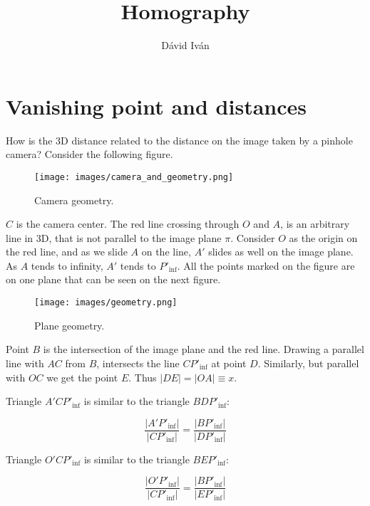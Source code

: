 \documentclass{article}
\title{Homography}
\author{Dávid Iván}
\begin{document}
\maketitle

\tableofcontents

\newpage

\section{Vanishing point and distances}

How is the 3D distance related to the distance on the image taken by a pinhole camera? Consider the following figure.

\begin{figure}[ht]
 \centering
  \texttt{[image: images/camera\_and\_geometry.png]}
 \caption{Camera geometry.}
\end{figure}

$C$ is the camera center. The red line crossing through $O$ and $A$, is an arbitrary line in 3D, that is not parallel to the image plane $\pi$. Consider $O$ as the origin on the red line, and as we slide $A$ on the line, $A'$ slides as well on the image plane. As $A$ tends to infinity, $A'$ tends to $P'_{\text{inf}}$. All the points marked on the figure are on one plane that can be seen on the next figure.

\begin{figure}[ht]
 \centering
  \texttt{[image: images/geometry.png]}
 \caption{Plane geometry.}
\end{figure}

Point $B$ is the intersection of the image plane and the red line. Drawing a parallel line with $AC$ from $B$, intersects the line $CP'_{\text{inf}}$ at point $D$. Similarly, but parallel with $OC$ we get the point $E$. Thus $|DE| = |OA| \equiv x$.

Triangle $A'CP'_{\text{inf}}$ is similar to the triangle $BDP'_{\text{inf}}$:

\begin{equation} \label{eq:sim1}
    \frac{|A'P'_{\text{inf}}|}{|CP'_{\text{inf}}|} = \frac{|BP'_{\text{inf}}|}{|DP'_{\text{inf}}|}
\end{equation}

Triangle $O'CP'_{\text{inf}}$ is similar to the triangle $BEP'_{\text{inf}}$:

\begin{equation} \label{eq:sim2}
    \frac{|O'P'_{\text{inf}}|}{|CP'_{\text{inf}}|} = \frac{|BP'_{\text{inf}}|}{|EP'_{\text{inf}}|}
\end{equation}
\end{document}
